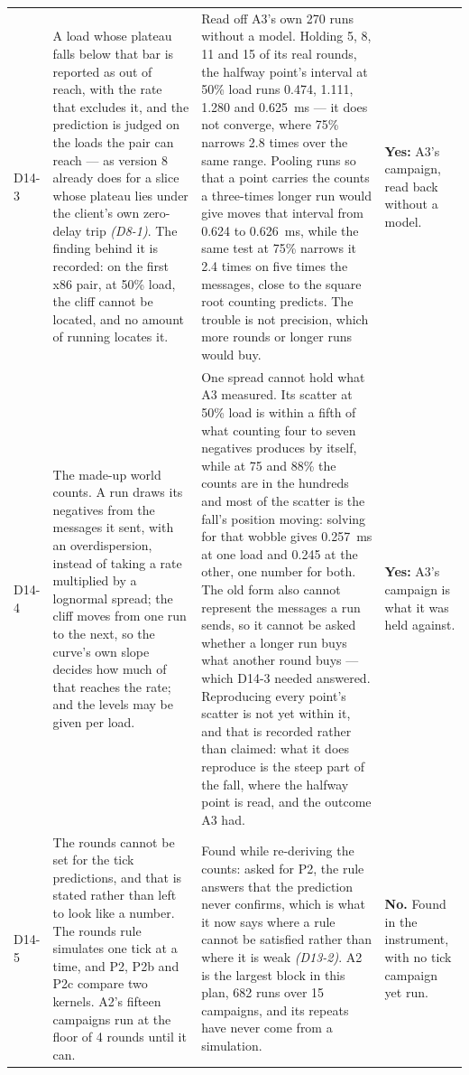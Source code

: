 \documentclass[11pt]{article}
\newcommand{\gl}[1]{{\color{soft}\itshape\small (#1)}}
\begin{document}
{\begin{longtable}{@{}p{1.1cm} >{\raggedright\arraybackslash}p{6.1cm} >{\raggedright\arraybackslash}p{6.0cm} >{\raggedright\arraybackslash}p{2.2cm}@{}}
D14-3 & A load whose plateau falls below that bar is reported as out of reach, with the rate that excludes it, and the prediction is judged on the loads the pair can reach --- as version 8 already does for a slice whose plateau lies under the client's own zero-delay trip \gl{D8-1}. The finding behind it is recorded: on the first x86 pair, at 50\% load, the cliff cannot be located, and no amount of running locates it. & Read off A3's own 270 runs without a model. Holding 5, 8, 11 and 15 of its real rounds, the halfway point's interval at 50\% load runs 0.474, 1.111, 1.280 and 0.625~ms --- it does not converge, where 75\% narrows 2.8 times over the same range. Pooling runs so that a point carries the counts a three-times longer run would give moves that interval from 0.624 to 0.626~ms, while the same test at 75\% narrows it 2.4 times on five times the messages, close to the square root counting predicts. The trouble is not precision, which more rounds or longer runs would buy. & \textbf{Yes:} A3's campaign, read back without a model. \\
D14-4 & The made-up world counts. A run draws its negatives from the messages it sent, with an overdispersion, instead of taking a rate multiplied by a lognormal spread; the cliff moves from one run to the next, so the curve's own slope decides how much of that reaches the rate; and the levels may be given per load. & One spread cannot hold what A3 measured. Its scatter at 50\% load is within a fifth of what counting four to seven negatives produces by itself, while at 75 and 88\% the counts are in the hundreds and most of the scatter is the fall's position moving: solving for that wobble gives 0.257~ms at one load and 0.245 at the other, one number for both. The old form also cannot represent the messages a run sends, so it cannot be asked whether a longer run buys what another round buys --- which D14-3 needed answered. Reproducing every point's scatter is not yet within it, and that is recorded rather than claimed: what it does reproduce is the steep part of the fall, where the halfway point is read, and the outcome A3 had. & \textbf{Yes:} A3's campaign is what it was held against. \\
D14-5 & The rounds cannot be set for the tick predictions, and that is stated rather than left to look like a number. The rounds rule simulates one tick at a time, and P2, P2b and P2c compare two kernels. A2's fifteen campaigns run at the floor of 4 rounds until it can. & Found while re-deriving the counts: asked for P2, the rule answers that the prediction never confirms, which is what it now says where a rule cannot be satisfied rather than where it is weak \gl{D13-2}. A2 is the largest block in this plan, 682 runs over 15 campaigns, and its repeats have never come from a simulation. & \textbf{No.} Found in the instrument, with no tick campaign yet run. \\
\bottomrule
\end{longtable}}
\end{document}
